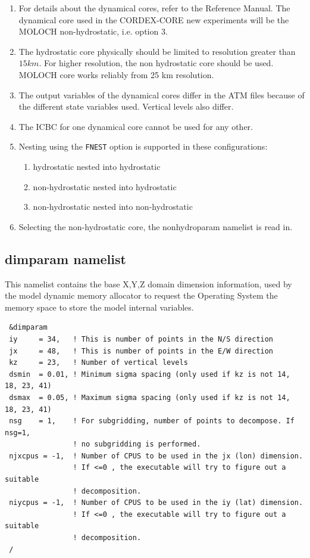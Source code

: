 \begin{enumerate}
\item For details about the dynamical cores, refer to the Reference Manual.
    The dynamical core used in the CORDEX-CORE new experiments will be the
        MOLOCH non-hydrostatic, i.e. option 3.
\item The hydrostatic core physically should be limited to resolution greater
    than $15 km$. For higher resolution, the non hydrostatic core should be
    used. MOLOCH core works reliably from 25 km resolution.
\item The output variables of the dynamical cores differ in the ATM files
    because of the different state variables used. Vertical levels also differ.
\item The ICBC for one dynamical core cannot be used for any other.
\item Nesting using the \verb=FNEST= option is supported in these
configurations:
\begin{enumerate}
\item hydrostatic nested into hydrostatic
\item non-hydrostatic nested into hydrostatic
\item non-hydrostatic nested into non-hydrostatic
\end{enumerate}
\item Selecting the non-hydrostatic core, the nonhydroparam namelist is read
in.
\end{enumerate}

\subsection{dimparam namelist}
\label{dimparam}

This namelist contains the base X,Y,Z domain dimension information, used
by the model dynamic memory allocator to request the Operating System the
memory space to store the model internal variables.

{\footnotesize
\begin{Verbatim}
 &dimparam
 iy     = 34,   ! This is number of points in the N/S direction
 jx     = 48,   ! This is number of points in the E/W direction
 kz     = 23,   ! Number of vertical levels
 dsmin  = 0.01, ! Minimum sigma spacing (only used if kz is not 14, 18, 23, 41)
 dsmax  = 0.05, ! Maximum sigma spacing (only used if kz is not 14, 18, 23, 41)
 nsg    = 1,    ! For subgridding, number of points to decompose. If nsg=1,
                ! no subgridding is performed.
 njxcpus = -1,  ! Number of CPUS to be used in the jx (lon) dimension.
                ! If <=0 , the executable will try to figure out a suitable
                ! decomposition.
 niycpus = -1,  ! Number of CPUS to be used in the iy (lat) dimension.
                ! If <=0 , the executable will try to figure out a suitable
                ! decomposition.
 /
\end{Verbatim}
}

